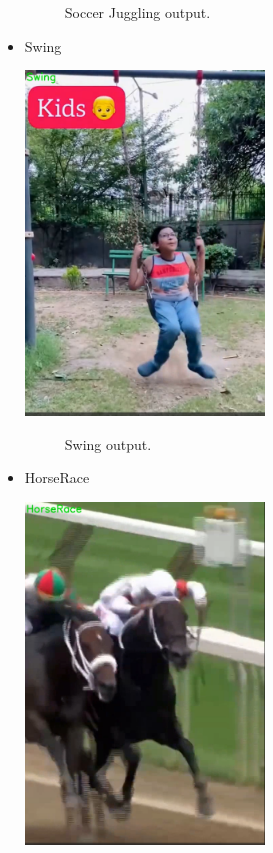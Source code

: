 \begin{itemize}
\begin{figure}[h!]
    	\caption[Soccer Juggling output .]{Soccer Juggling output.}
    	\label{soccer_lrcn.png} 
        \end{figure}
    \item Swing

        \includegraphics[width=0.5\textwidth]{Figures/swing_lrcn.png}
        \begin{figure}[h!]
    	\centering
    	
    	\caption[Swing output .]{Swing output.}
    	\label{swing_lrcn.png} 
        \end{figure}
        
    \item HorseRace

        \includegraphics[width=0.5\textwidth]{Figures/race_lrcn.png}
        \begin{figure}[h!]
    	\centering
    	

\end{figure}
\end{itemize}
